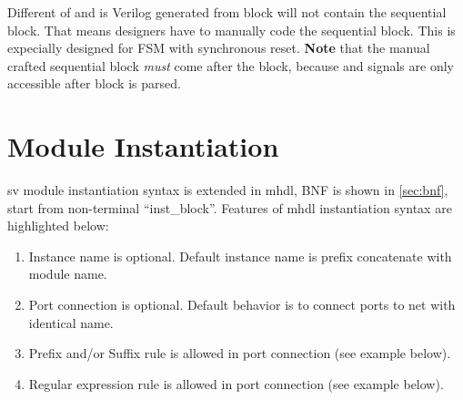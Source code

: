 Different of  and  is Verilog generated 
from  block will not contain the sequential block. 
That means designers have to manually code the sequential block. 
This is expecially designed for FSM with synchronous reset. 
\textbf{Note} that the manual crafted sequential block \emph{must}
come after the  block, because  and 
signals are only accessible after  block is parsed. 

\section{Module Instantiation}
\gls{sv} module instantiation syntax is extended in \gls{mhdl}, BNF is
shown in \autoref{sec:bnf}, start from non-terminal ``inst\_block''.
Features of \gls{mhdl} instantiation syntax are highlighted below:
\begin{enumerate}
\item Instance name is optional. Default instance name is prefix 
concatenate with module name. 
\item Port connection is optional. Default behavior is to connect ports 
  to net with identical name. 
\item Prefix and/or Suffix rule is allowed in port connection (see example below). 
\item Regular expression rule is allowed in port connection (see example below).
\end{enumerate}
